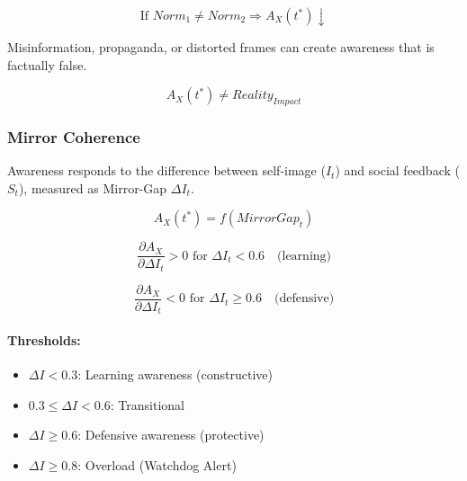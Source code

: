 \begin{equation}
\text{If } Norm_1 \neq Norm_2 \Rightarrow A_X(t^*) \downarrow
\end{equation}

\begin{axiom}
\label{ax:awx-a69}
Misinformation, propaganda, or distorted frames can create awareness 
that is factually false.
\end{axiom}

\begin{equation}
A_X(t^*) \neq Reality_{Impact}
\end{equation}

\subsubsection{Mirror Coherence}

\begin{axiom}
\label{ax:awx-a70a}
Awareness responds to the difference between self-image ($I_t$) and 
social feedback ($S_t$), measured as Mirror-Gap $\Delta I_t$.
\end{axiom}

\begin{equation}
A_X(t^*) = f(MirrorGap_t)
\end{equation}

\begin{equation}
\frac{\partial A_X}{\partial \Delta I_t} > 0 \text{ for } \Delta I_t < 0.6 \quad \text{(learning)}
\end{equation}

\begin{equation}
\frac{\partial A_X}{\partial \Delta I_t} < 0 \text{ for } \Delta I_t \geq 0.6 \quad \text{(defensive)}
\end{equation}

\paragraph{Thresholds:}
\begin{itemize}
\item $\Delta I < 0.3$: Learning awareness (constructive)
\item $0.3 \leq \Delta I < 0.6$: Transitional
\item $\Delta I \geq 0.6$: Defensive awareness (protective)
\item $\Delta I \geq 0.8$: Overload (Watchdog Alert)
\end{itemize}

